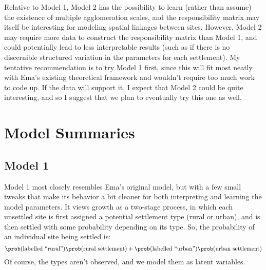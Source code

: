 \documentclass[english]{scrartcl}
\begin{document}
  	Relative to Model 1, Model 2 has the possibility to learn (rather than assume) the existence of multiple agglomeration scales, and the responsibility matrix may itself be interesting for modeling spatial linkages between sites. 
  	However, Model 2 may require more data to construct the responsibility matrix than Model 1, and could potentially lead to less interpretable results (such as if there is no discernible structured variation in the parameters for each settlement). 
  	My tentative recommendation is to try Model 1 first, since this will fit most neatly with Ema's existing theoretical framework and wouldn't require too much work to code up. 
  	If the data will support it, I expect that Model 2 could be quite interesting, and so I suggest that we plan to eventually try this one as well. 

\section{Model Summaries}
	\subsection*{Model 1}
		Model 1 most closely resembles Ema's original model, but with a few small tweaks that make its behavior a bit cleaner for both interpreting and learning the model parameters. 
		It views growth as a two-stage process, in which each unsettled site is first assigned a potential settlement type (rural or urban), and is then settled with some probability depending on its type. 
		So, the probability of an individual site being settled is: 
		\begin{equation*}
			\prob(\text{labelled ``rural''})\prob(\text{rural settlement}) + \prob(\text{labelled ``urban''})\prob(\text{urban settlement})
		\end{equation*}
		Of course, the types aren't observed, and we model them as latent variables. 
\end{document}
